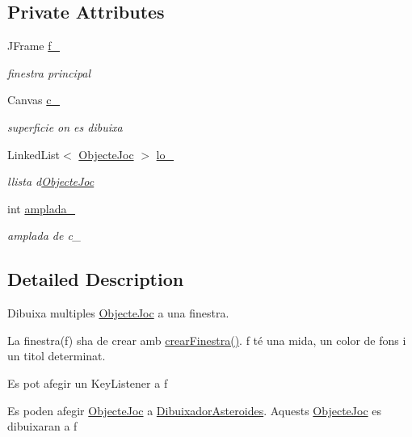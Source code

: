 \subsection*{Private Attributes}
\begin{DoxyCompactItemize}
\item 
J\+Frame \hyperlink{class_dibuixador_asteroides_acd1dc7eee6ddda629759fc422566b11b}{f\+\_\+}
\begin{DoxyCompactList}\small\item\em finestra principal \end{DoxyCompactList}\item 
Canvas \hyperlink{class_dibuixador_asteroides_a634f3d95d02d08c9d21d2eef2c3bb410}{c\+\_\+}
\begin{DoxyCompactList}\small\item\em superficie on es dibuixa \end{DoxyCompactList}\item 
Linked\+List$<$ \hyperlink{interface_objecte_joc}{Objecte\+Joc} $>$ \hyperlink{class_dibuixador_asteroides_aafc049ca18d07bf9cf5f61b7e8e1e06f}{lo\+\_\+}
\begin{DoxyCompactList}\small\item\em llista d\textquotesingle{}\hyperlink{interface_objecte_joc}{Objecte\+Joc} \end{DoxyCompactList}\item 
int \hyperlink{class_dibuixador_asteroides_ac5680a5fd826ac9a412b9739f5f64a12}{amplada\+\_\+}
\begin{DoxyCompactList}\small\item\em amplada de c\+\_\+ \end{DoxyCompactList}\end{DoxyCompactItemize}


\subsection{Detailed Description}
Dibuixa multiples \hyperlink{interface_objecte_joc}{Objecte\+Joc} a una finestra. 

La finestra(f) s\textquotesingle{}ha de crear amb \hyperlink{class_dibuixador_asteroides_a54a43290703d14aee21e5c87a5e6fc5b}{crear\+Finestra()}. f té una mida, un color de fons i un titol determinat.

Es pot afegir un Key\+Listener a f

Es poden afegir \hyperlink{interface_objecte_joc}{Objecte\+Joc} a \hyperlink{class_dibuixador_asteroides}{Dibuixador\+Asteroides}. Aquests \hyperlink{interface_objecte_joc}{Objecte\+Joc} es dibuixaran a f

